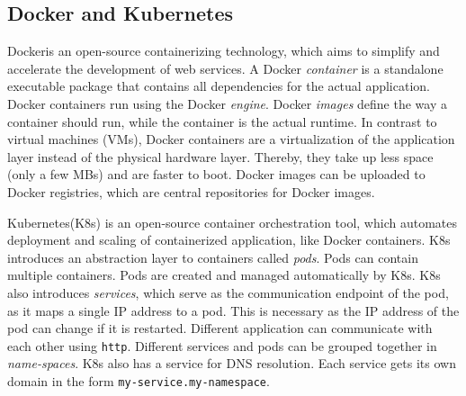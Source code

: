 \subsection{Docker and Kubernetes}
Docker\footnotemark is an open-source containerizing technology, which aims to simplify and accelerate the development of web services.
A Docker \emph{container} is a standalone executable package that contains all dependencies for the actual application. Docker containers run using the Docker \emph{engine}. Docker \emph{images} define the way a container should run, while the container is the actual runtime.
In contrast to virtual machines (VMs), Docker containers are a virtualization of the application layer instead of the physical hardware layer. Thereby, they take up less space (only a few MBs) and are faster to boot.
Docker images can be uploaded to Docker registries\footnotemark, which are central repositories for Docker images. 

Kubernetes\footnotemark (K8s) is an open-source container orchestration tool, which automates deployment and scaling of containerized application, like Docker containers. 
K8s introduces an abstraction layer to containers called \emph{pods}. Pods can contain multiple containers. Pods are created and managed automatically by K8s. K8s also introduces \emph{services}, which serve as the communication endpoint of the pod, as it maps a single IP address to a pod. This is necessary as the IP address of the pod can change if it is restarted.
Different application can communicate with each other using \texttt{http}. 
Different services and pods can be grouped together in \emph{name-spaces}.
K8s also has a service for DNS resolution. Each service gets its own domain in the form \texttt{my-service.my-namespace}.
